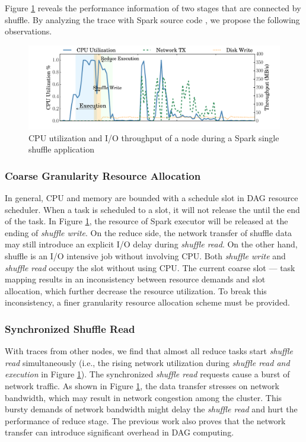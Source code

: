 Figure \ref{fig:util} reveals the performance information of two stages that are connected by shuffle. By analyzing the trace with Spark source code \cite{sparksource}, we propose the following observations.

\begin{figure}
	\includegraphics[width=\linewidth]{fig/util}
	\caption{CPU utilization and I/O throughput of a node during a Spark single shuffle application}
	\vspace{-1em}
	\label{fig:util}
\end{figure}

\subsubsection{Coarse Granularity Resource Allocation}
In general, CPU and memory are bounded with a schedule slot in DAG resource scheduler. When a task is scheduled to a slot, it will not release the until the end of the task. In Figure \ref{fig:util}, the resource of Spark executor will be released at the ending of \textit{shuffle write}. On the reduce side, the network transfer of shuffle data may still introduce an explicit I/O delay during \textit{shuffle read}. On the other hand, shuffle is an I/O intensive job without involving CPU. Both \textit{shuffle write} and \textit{shuffle read} occupy the slot without using CPU. The current coarse slot --- task mapping results in an inconsistency between resource demands and slot allocation, which further decrease the resource utilization. To break this inconsistency, a finer granularity resource allocation scheme must be provided.

\subsubsection{Synchronized Shuffle Read}
With traces from other nodes, we find that almost all reduce tasks start \textit{shuffle read} simultaneously (i.e., the rising network utilization during \textit{shuffle read and execution} in Figure \ref{fig:util}). The synchronized \textit{shuffle read} requests cause a burst of network traffic. As shown in Figure \ref{fig:util}, the data transfer stresses on network bandwidth, which may result in network congestion among the cluster. This bursty demands of network bandwidth might delay the \textit{shuffle read} and hurt the performance of reduce stage. The previous work \cite{coflow, managing} also proves that the network transfer can introduce significant overhead in DAG computing.

